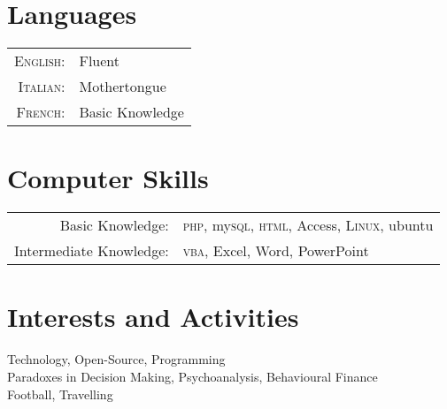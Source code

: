 \documentclass[a4paper,10pt]{article} %
\begin{document}
\section{Languages}

\begin{tabular}{rl}
\textsc{English:} & Fluent\\

\textsc{Italian:} & Mothertongue\\

\textsc{French:} & Basic Knowledge\\
\end{tabular}


\section{Computer Skills}

\begin{tabular}{rl}
Basic Knowledge: & \textsc{php}, my\textsc{sql}, \textsc{html}, Access, \textsc{Linux}, ubuntu\\

Intermediate Knowledge: & \textsc{vba}, Excel, Word, PowerPoint\\
\end{tabular}


\section{Interests and Activities}

Technology, Open-Source, Programming\\
Paradoxes in Decision Making, Psychoanalysis, Behavioural Finance\\
Football, Travelling


\newpage

\end{document}
